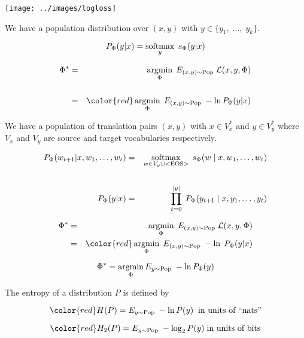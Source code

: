 {

\centerline{\texttt{[image: ../images/logloss]}}


We have a population distribution over $(x,y)$ with $y \in \{y_1,\;\ldots,\;y_k\}$.

\vfill
$$P_\Phi(y|x) = \operatorname*{softmax}_y\;s_\Phi(y|x)$$

\vfill
\begin{eqnarray*}
  \Phi^* & = & \argmin_\Phi\;E_{(x,y) \sim \mathrm{Pop}}\;{\cal L}(x,y,\Phi) \\
  \\
  & = & {\color{red} \argmin_\Phi\;E_{(x,y) \sim \mathrm{Pop}}\;- \ln P_\Phi(y|x)}
\end{eqnarray*}


We have a population of translation pairs $(x,y)$ with $x \in V_x^*$ and $y \in V_y^*$ where
$V_x$ and $V_y$ are source and target vocabularies respectively.

\vfill
\begin{eqnarray*}
  P_\Phi(w_{t+1} | x,w_1,\ldots,w_t) & = & \operatorname*{softmax}_{w \in V_y \cup \mathrm{<EOS>}} \; s_\Phi(w\;|\;x,w_1,\ldots,w_t) \\
  \\
  P_\Phi(y|x) & = & \prod_{t = 0}^{|y|} \;P_\Phi(y_{t+1}\;|\;x,y_1,\ldots,y_t)
\end{eqnarray*}

\vfill
\begin{eqnarray*}
  \Phi^* & = & \argmin_\Phi \;E_{(x,y) \sim \mathrm{Pop}} \;{\cal L}(x,y,\Phi) \\
  & = & {\color{red} \argmin_\Phi \;E_{(x,y) \sim \mathrm{Pop}} \;-\ln \;P_\Phi(y|x)}
\end{eqnarray*}


{\color{red} $$\Phi^* = \operatorname*{argmin}_\Phi E_{y \sim \mathrm{Pop}}\;- \ln P_\Phi(y)$$}


The entropy of a distribution $P$ is defined by

$${\color{red} H(P) = E_{y \sim \pop} \;- \ln P(y)}\;\;\mbox{in units of ``nats''}$$

$${\color{red} H_2(P) = E_{y \sim \pop} \;- \log_2 P(y)}\; \mbox{in units of bits}$$

}
